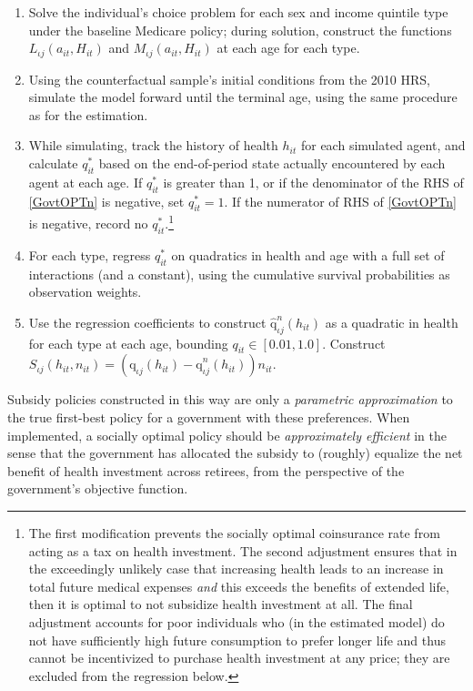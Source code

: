 \documentclass[12pt,pdftex,letterpaper]{article}
\newcommand{\Type}{\iota}
\newcommand{\Health}{h}
\newcommand{\PostHealth}{H}
\newcommand{\Invst}{n}
\newcommand{\Assets}{a}
\newcommand{\Copay}{q}
\newcommand{\Subsidy}{S}
\newcommand{\CopayFunc}{\text{\Copay}}
\newcommand{\Age}{j}
\begin{document}
\begin{enumerate}
\item Solve the individual's choice problem for each sex and income quintile type under the baseline Medicare policy; during solution, construct the functions $L_{\Type \Age}(\Assets_{it},\PostHealth_{it})$ and $M_{\Type \Age}(\Assets_{it},\PostHealth_{it})$ at each age for each type.

\item Using the counterfactual sample's initial conditions from the 2010 HRS, simulate the model forward until the terminal age, using the same procedure as for the estimation.

\item While simulating, track the history of health $\Health_{it}$ for each simulated agent, and calculate $\Copay_{it}^*$ based on the end-of-period state actually encountered by each agent at each age.  If $\Copay_{it}^*$ is greater than 1, or if the denominator of the RHS of \eqref{GovtOPTn} is negative, set $\Copay_{it}^* = 1$.  If the numerator of  RHS of \eqref{GovtOPTn} is negative, record no $\Copay_{it}^*$.\footnote{The first modification prevents the socially optimal coinsurance rate from acting as a tax on health investment.  The second adjustment ensures that in the exceedingly unlikely case that increasing health leads to an increase in total future medical expenses \textit{and} this exceeds the benefits of extended life, then it is optimal to not subsidize health investment at all.  The final adjustment accounts for poor individuals who (in the estimated model) do not have sufficiently high future consumption to prefer longer life and thus cannot be incentivized to purchase health investment at any price; they are excluded from the regression below.}

\item For each type, regress $\Copay_{it}^*$ on quadratics in health and age with a full set of interactions (and a constant), using the cumulative survival probabilities as observation weights.

\item Use the regression coefficients to construct $\hat{\CopayFunc}^\Invst_{\Type \Age}(\Health_{it})$ as a quadratic in health for each type at each age, bounding $\Copay_{it} \in [0.01,1.0]$.  Construct $\Subsidy_{\Type \Age}(\Health_{it},\Invst_{it}) = (\CopayFunc_{\Type \Age}(\Health_{it}) - \hat{\CopayFunc}^\Invst_{\Type \Age}(\Health_{it})) \Invst_{it}$.
\end{enumerate}
Subsidy policies constructed in this way are only a \textit{parametric approximation} to the true first-best policy for a government with these preferences.  When implemented, a socially optimal policy should be \textit{approximately efficient} in the sense that the government has allocated the subsidy to (roughly) equalize the net benefit of health investment across retirees, from the perspective of the government's objective function.
\end{document}
